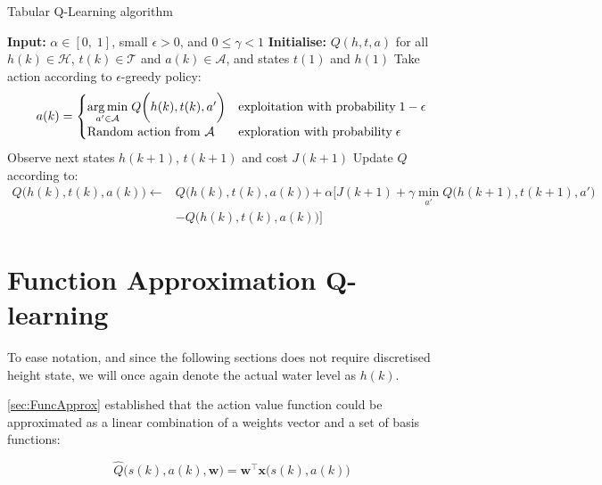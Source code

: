 \begin{algorithm}
	\caption{Tabular Q-Learning algorithm}
	\label{alg:Q-learning}
	\begin{algorithmic}[1]
		\State \textbf{Input:} $\alpha\in[0,\;1]$, small $\epsilon>0$, and $0\leq\gamma < 1$ 
		\State \textbf{Initialise:} $ Q(h,t,a) $ for all $ h(k) \in \mathcal{H} $, $ t(k) \in \mathcal{T}$ and $ a(k) \in \mathcal{A} $, and states $ t(1) $ and $ h(1) $ 
		\State Take action according to $\epsilon$-greedy policy:
		\begin{equation*}
			a(k) = \begin{cases} 
				\underset{a'\in \mathcal{A}}{\arg\min} \; Q\bigg(h(k),t(k),a'\bigg) & \text{exploitation with probability} \; 1-\epsilon  \\
				\text{Random action from $ \mathcal{A} $} & \text{exploration with probability} \; \epsilon 
			\end{cases}
		\end{equation*}
	\State Observe next states $ h(k+1) $, $ t(k+1) $ and cost $ J(k+1)$ 
	\State Update $ Q $ according to:
		\begin{equation*}
		\begin{split}
			Q\bigg(h(k),t(k),a(k)\bigg)\leftarrow &Q\bigg(h(k),t(k),a(k)\bigg)+\alpha \bigg[J(k+1)+\gamma \min_{a'} Q\bigg(h(k+1),t(k+1),a'\bigg)\\
			&-Q\bigg(h(k),t(k),a(k)\bigg)\bigg]
		\end{split}
	\end{equation*}
		\EndFor
	\end{algorithmic}
\end{algorithm}



\section{Function Approximation Q-learning}\label{sec:WDNFunctionApproximationQ-Learning}

To ease notation, and since the following sections does not require discretised height state, we will once again denote the actual water level as $h(k)$.

\cref{sec:FuncApprox} established that the action value function could be approximated as a linear combination of a weights vector and a set of basis functions:

\begin{equation}
	\hat{Q}\bigg(s(k),a(k),\textbf{w}\bigg)=\textbf{w}^{\intercal}\textbf{x}\bigg(s(k),a(k)\bigg)
\end{equation}

